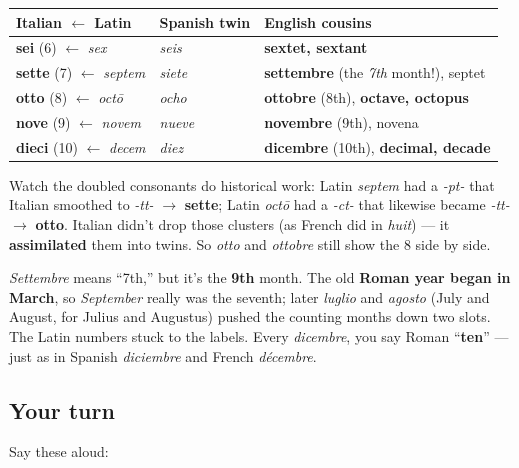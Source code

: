 \begin{cousinweb}
\noindent
\begin{tabularx}{\linewidth}{@{}>{\raggedright\arraybackslash}X>{\raggedright\arraybackslash}X>{\raggedright\arraybackslash}X@{}}
\toprule
\textbf{Italian $\leftarrow$ Latin} & \textbf{Spanish twin} & \textbf{English cousins} \\
\midrule
\textbf{sei} (6) $\leftarrow$ \emph{sex} & \emph{seis} & \textbf{sextet, sextant} \\
\textbf{sette} (7) $\leftarrow$ \emph{septem} & \emph{siete} & \textbf{settembre} (the \emph{7th} month!), septet \\
\textbf{otto} (8) $\leftarrow$ \emph{octō} & \emph{ocho} & \textbf{ottobre} (8th), \textbf{octave, octopus} \\
\textbf{nove} (9) $\leftarrow$ \emph{novem} & \emph{nueve} & \textbf{novembre} (9th), novena \\
\textbf{dieci} (10) $\leftarrow$ \emph{decem} & \emph{diez} & \textbf{dicembre} (10th), \textbf{decimal, decade} \\
\bottomrule
\end{tabularx}

Watch the doubled consonants do historical work: Latin \emph{septem} had a \emph{-pt-} that Italian smoothed to \emph{-tt-} $\to$ \textbf{sette}; Latin \emph{octō} had a \emph{-ct-} that likewise became \emph{-tt-} $\to$ \textbf{otto}. Italian didn't drop those clusters (as French did in \emph{huit}) — it \textbf{assimilated} them into twins. So \emph{otto} and \emph{ottobre} still show the 8 side by side.
\end{cousinweb}

\begin{grammarlens}[title={Grammar Lens: why the months are \textquotedblleft{}off by two\textquotedblright{}}]
\emph{Settembre} means \textquotedblleft{}7th,\textquotedblright{} but it's the \textbf{9th} month. The old \textbf{Roman year began in March}, so \emph{September} really was the seventh; later \emph{luglio} and \emph{agosto} (July and August, for Julius and Augustus) pushed the counting months down two slots. The Latin numbers stuck to the labels. Every \emph{dicembre}, you say Roman \textquotedblleft{}\textbf{ten}\textquotedblright{} — just as in Spanish \emph{diciembre} and French \emph{décembre}.
\end{grammarlens}

\subsection*{Your turn}
Say these aloud:

